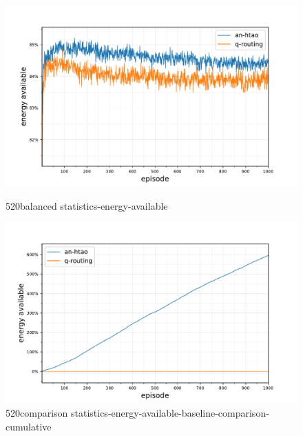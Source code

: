 \begin{figure}[ht]
	\begin{minipage}{.49\textwidth}
		\centering
		\includegraphics[width=1.0\linewidth,trim={25pt 0pt 50pt 0pt},clip]{520balanced_statistics-energy-available}
		\captionsetup{labelfont=bf,singlelinecheck=on}
		\caption{520balanced statistics-energy-available}
		\label{fig:520balanced_statistics-energy-available}
	\end{minipage}
	\begin{minipage}{.49\textwidth}
		\centering
		\includegraphics[width=1.0\linewidth,trim={25pt 0pt 50pt 0pt},clip]{520comparison_statistics-energy-available-baseline-comparison-cumulative}
		\captionsetup{labelfont=bf,singlelinecheck=on}
		\caption{520comparison statistics-energy-available-baseline-comparison-cumulative}
		\label{fig:520comparison_statistics-energy-available-baseline-comparison-cumulative}
	\end{minipage}\hfill%
\end{figure}

